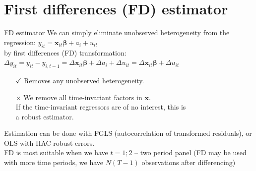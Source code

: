 \documentclass[usenames,dvipsnames]{beamer}
\begin{document}
\section{First differences (FD) estimator}
\begin{frame}{FD estimator}
We can simply eliminate unobserved heterogeneity from the regression: \quad $y_{it} = \bm{x}_{it} \bm{\beta} + a_i + u_{it}$ \\
by first differences (FD) transformation: \\
$\Delta y_{it} = y_{it} - y_{i,t-1} = \Delta \bm{x}_{it} \bm{\beta} + \Delta a_i + \Delta u_{it} = \Delta \bm{x}_{it} \bm{\beta} + \Delta u_{it}$
\begin{itemize}
\item[$\checkmark$] Removes any unobserved heterogeneity.
\item[$\times$] We remove all time-invariant factors in $\bm{x}$.\\
If the time-invariant regressors are of no interest, this is \\a robust estimator.
\end{itemize}
Estimation can be done with FGLS (autocorrelation of transformed residuals), or OLS with HAC robust errors. \\
\medskip
FD is most suitable when we have $t = 1; 2$ – two period panel (FD may be used with more time periods, we have $N(T-1)$ observations after differencing)
\end{frame}
\end{document}
